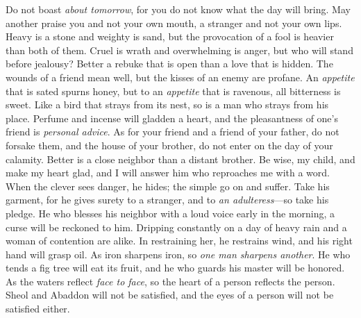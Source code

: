 \begin{biblechapter} %
\verse Do not boast \textit{about tomorrow}, 
for you do not know what the day will bring.
\verse May another praise you and not your own mouth, 
a stranger and not your own lips.
\verse Heavy is a stone and weighty is sand, 
but the provocation of a fool is heavier than both of them.
\verse Cruel is wrath and overwhelming is anger, 
but who will stand before jealousy?
\verse Better a rebuke that is open 
than a love that is hidden.
\verse The wounds of a friend mean well, 
but the kisses of an enemy are profane.
\verse An \textit{appetite} that is sated spurns honey, 
but to an \textit{appetite} that is ravenous, all bitterness is sweet.
\verse Like a bird that strays from its nest, 
so is a man who strays from his place.
\verse Perfume and incense will gladden a heart, 
and the pleasantness of one’s friend is \textit{personal advice}.
\verse As for your friend and a friend of your father, do not forsake them, 
and the house of your brother, do not enter on the day of your calamity. 
Better is a close neighbor than a distant brother.
\verse Be wise, my child, and make my heart glad, 
and I will answer him who reproaches me with a word.
\verse When the clever sees danger, he hides; 
the simple go on and suffer.
\verse Take his garment, for he gives surety to a stranger, 
and to \textit{an adulteress}—so take his pledge.
\verse He who blesses his neighbor with a loud voice 
early in the morning, 
a curse will be reckoned to him.
\verse Dripping constantly on a day of heavy rain 
and a woman of contention are alike.
\verse In restraining her, he restrains wind, 
and his right hand will grasp oil.
\verse As iron sharpens iron, 
so \textit{one man sharpens another}.
\verse He who tends a fig tree will eat its fruit, 
and he who guards his master will be honored.
\verse As the waters reflect \textit{face to face}, 
so the heart of a person reflects the person.
\verse Sheol and Abaddon will not be satisfied, 
and the eyes of a person will not be satisfied either.

\end{biblechapter}
